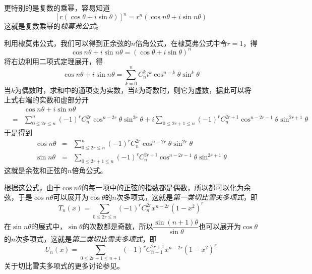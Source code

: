 更特别的是复数的乘幂，容易知道
\begin{equation}
  \label{eq:de-moivre-formula}
  [r(\cos{\theta}+i\sin{\theta})]^n = r^n(\cos{n\theta}+i\sin{n\theta})
\end{equation}
这就是复数乘幂的\emph{棣莫弗公式}。

\begin{example}
  利用棣莫弗公式，我们可以得到正余弦的$n$倍角公式，在棣莫弗公式中令$r=1$，得
  \[ \cos{n\theta}+i\sin{n\theta} = (\cos{\theta}+i\sin{\theta})^n \]
  将右边利用二项式定理展开，得
  \[ \cos{n\theta}+i\sin{n\theta} = \sum_{k=0}^n C_n^k i^k \cos^{n-k}{\theta}\sin^k{\theta} \]
  当$k$为偶数时，求和中的通项变为实数，当$k$为奇数时，则它为虚数，据此可以将上式右端的实数和虚部分开
  \begin{eqnarray*}
   && \cos{n\theta}+i\sin{n\theta}  \\
    & = & \sum_{0 \leqslant 2r \leqslant n}^n (-1)^rC_n^{2r} \cos^{n-2r}{\theta}\sin^{2r}{\theta} + i\sum_{0 \leqslant 2r+1 \leqslant n}(-1)^rC_n^{2r+1} \cos^{n-2r-1}{\theta}\sin^{2r+1}{\theta} 
  \end{eqnarray*}
  于是得到
  \begin{eqnarray}
    \label{eq:cos-sin-of-n-theta}
    \cos{n\theta} & = & \sum_{0 \leqslant 2r \leqslant n}^n (-1)^rC_n^{2r} \cos^{n-2r}{\theta}\sin^{2r}{\theta} \\
    \sin{n\theta} & = & \sum_{0 \leqslant 2r+1 \leqslant n}(-1)^rC_n^{2r+1} \cos^{n-2r-1}{\theta}\sin^{2r+1}{\theta}
  \end{eqnarray}
  这就是余弦和正弦的$n$倍角公式。

  根据这公式，由于$\cos{n\theta}$的每一项中的正弦的指数都是偶数，所以都可以化为余弦，于是$\cos{n\theta}$可以展开为$\cos{\theta}$的$n$次多项式，这就是\emph{第一类切比雪夫多项式}，即
  \[ T_n(x) = \sum_{0 \leqslant 2r\leqslant n}(-1)^rC_n^{2r}x^{n-2r}(1-x^2)^r \]
  在$\sin{n\theta}$的展式中，$\sin{\theta}$的次数都是奇数，所以$\dfrac{\sin{(n+1)\theta}}{\sin{\theta}}$也可以展开为$\cos{\theta}$的$n$次多项式，这就是\emph{第二类切比雪夫多项式}，即
  \[ U_n(x)=\sum_{0 \leqslant 2r+1 \leqslant n+1}(-1)^rC_{n+1}^{2r+1}x^{n-2r}(1-x^2)^r \]
  关于切比雪夫多项式的更多讨论参见\cite{elementary-number-theory}。
\end{example}

